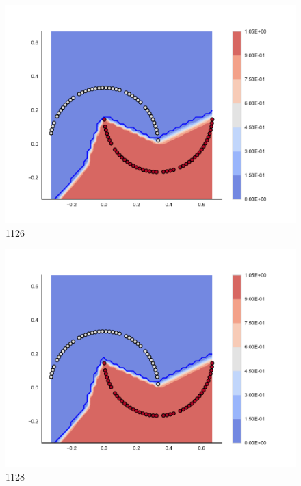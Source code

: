 \begin{subfigure}[b]{0.09\textwidth}
    \includegraphics[clip, trim=2.35cm 1.75cm 4.5cm 0cm,width=\textwidth]{img/convergence/1126.pdf}
    \caption{1126}
    \label{fig:convergence_1126}
\end{subfigure}
%
\begin{subfigure}[b]{0.09\textwidth}
    \includegraphics[clip, trim=2.35cm 1.75cm 4.5cm 0cm,width=\textwidth]{img/convergence/1128.pdf}
    \caption{1128}
    \label{fig:convergence_1128}
\end{subfigure}
%
